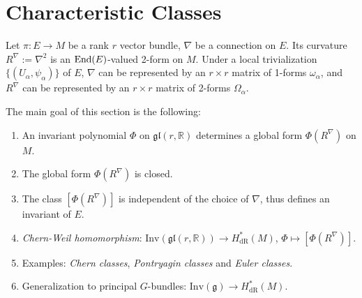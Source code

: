 \section{Characteristic Classes}
Let $\pi:E\to M$ be a rank $r$ vector bundle, 
$\nabla$ be a connection on $E$.
Its curvature $R^\nabla := \nabla^2$ is an ${\rm End}(E)$-valued 2-form on $M$. 
Under a local trivialization $\{(U_\alpha,\psi_\alpha)\}$ of $E$, 
$\nabla$ can be represented by an $r\times r$ matrix of 1-forms $\omega_\alpha$, 
and $R^\nabla$ can be represented by an $r\times r$ matrix of 2-forms $\Omega_\alpha$.  

The main goal of this section is the following: 
\begin{enumerate}
    \item An invariant polynomial $\Phi$  on $\mathfrak{gl}(r,\mathbb{R})$ 
    determines a global form $\Phi(R^\nabla)$ on $M$.
    \item The global form $\Phi(R^\nabla)$ is closed.
    \item The class $[\Phi(R^\nabla)]$ is independent of the choice of $\nabla$, 
    thus defines an invariant of $E$.
    \item \emph{Chern-Weil homomorphism}: $\mathrm{Inv}(\mathfrak{gl}(r,\mathbb{R}))\to H_{\mathrm{dR}}^{*}(M)$, $\Phi\mapsto[\Phi(R^\nabla)]$. 
    \item Examples: \emph{Chern classes}, \emph{Pontryagin classes} and \emph{Euler classes}. 
    \item Generalization to principal $G$-bundles: $\mathrm{Inv}(\mathfrak{g})\to H_{\mathrm{dR}}^{*}(M)$.
\end{enumerate}



